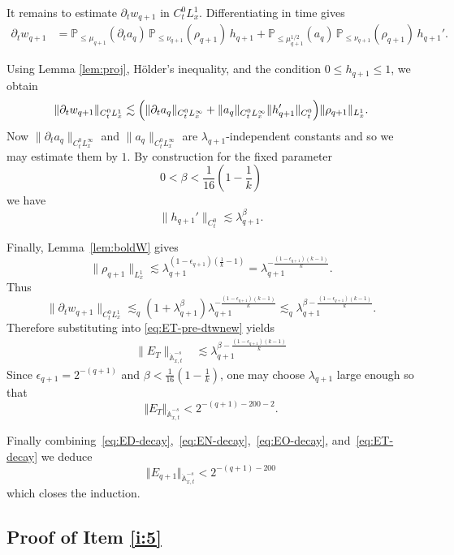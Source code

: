 \documentclass[12pt,reqno,letterpaper]{amsart}
\numberwithin{equation}{section}
\newcommand{\1}{{\bf 1}}
\newcommand{\2}{{\bf 2}}
\newcommand{\norm}[1]{ \Vert #1 \Vert}
\theoremstyle{remark}
\theoremstyle{remark}
\begin{document}
It remains to estimate $\partial_t w_{q+1}$ in $C_t^0 L_x^1$. Differentiating in time gives 
\begin{align*}
    \partial_t w_{q+1}
&=
\mathbb P_{\le \mu_{q+1}}(\partial_t a_q)\,
\mathbb P_{\le \nu_{q+1}}(\rho_{q+1})\,
h_{q+1}
+
\mathbb P_{\le \mu_{q+1}^{1/2}}(a_q)\,
\mathbb P_{\le \nu_{q+1}}(\rho_{q+1})\,
h_{q+1}'.
\end{align*}

Using Lemma \ref{lem:proj}, H\"older's inequality, and the condition $0\le h_{q+1}\le 1$, we obtain
\[
\|\partial_t w_{q+1}\|_{C_t^0L_x^1}
\lesssim
\Bigl(
\|\partial_t a_q\|_{C_t^0L_x^\infty}
+
\|a_q\|_{C_t^0L_x^\infty}\| h_{q+1}'\|_{C_t^0}
\Bigr)
\|\rho_{q+1}\|_{L_x^1}.
\]
Now $\|\partial_t a_q\|_{C_t^0L_x^\infty}$ and $\|a_q\|_{C_t^0L_x^\infty}$ are $\lambda_{q+1}$-independent constants and so we may estimate them by $1$. By construction for the fixed parameter
\[
0<\beta<\frac{1}{16}\left(1-\frac{1}{k}\right)
\]
we have
\[
\|h_{q+1}'\|_{C_t^0}\lesssim \lambda^{\beta}_{q+1}.
\]

Finally, Lemma~\ref{lem:boldW} gives
\[
\|\rho_{q+1}\|_{L_x^1}
\lesssim
\lambda_{q+1}^{(1-\epsilon_{q+1})\left(\frac1k-1\right)}
=
\lambda_{q+1}^{-\frac{(1-\epsilon_{q+1})(k-1)}{k}}.
\]
Thus
\[
\|\partial_t w_{q+1}\|_{C_t^0L_x^1}
\lesssim_q
(1+\lambda^{\beta}_{q+1})
\lambda_{q+1}^{-\frac{(1-\epsilon_{q+1})(k-1)}{k}}
\lesssim_q
\lambda_{q+1}^{\beta-\frac{(1-\epsilon_{q+1})(k-1)}{k}}.
\]
Therefore substituting into \eqref{eq:ET-pre-dtwnew} yields
\begin{align*}
      \|E_T\|_{\dot{\mathbb{A}}_{x,t}^{-s}} &\lesssim \lambda_{q+1}^{\beta-\frac{(1-\epsilon_{q+1})(k-1)}{k}} 
\end{align*}
Since $\epsilon_{q+1} = 2^{-(q+1)}$ and $\beta < \frac{1}{16}\left(1-\frac{1}{k}\right)$, one may choose $\lambda_{q+1}$ large enough so that 
\begin{equation}\label{eq:ET-decay}
    \norm{E_T}_{\dot{\mathbb{A}}_{x,t}^{-s}}
    <
   2^{-(q+1) - 200 - 2}.
\end{equation}

Finally combining~\eqref{eq:ED-decay},~\eqref{eq:EN-decay},~\eqref{eq:EO-decay}, and~\eqref{eq:ET-decay} we deduce
$$
\Vert E_{q+1} \Vert_{\dot{\mathbb{A}}_{x,t}^{-s}} < 2^{-(q+1) - 200}
$$
which closes the induction.


\subsection{Proof of Item \ref{i:5}}\label{subsec:i5}
\end{document}
